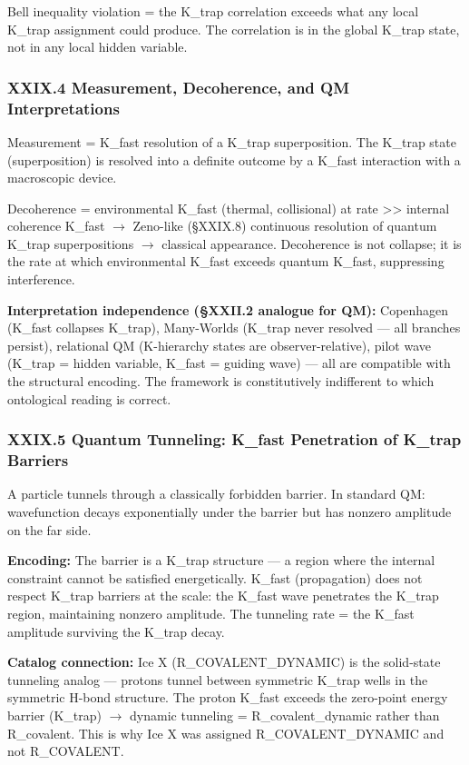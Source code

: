 \documentclass[12pt,a4paper]{article}
\begin{document}
Bell inequality violation = the K\_trap correlation exceeds what any local K\_trap assignment could produce. The correlation is in the global K\_trap state, not in any local hidden variable.

\subsubsection{XXIX.4 Measurement, Decoherence, and QM Interpretations}

Measurement = K\_fast resolution of a K\_trap superposition. The K\_trap state (superposition) is resolved into a definite outcome by a K\_fast interaction with a macroscopic device.

Decoherence = environmental K\_fast (thermal, collisional) at rate \textgreater{}\textgreater{} internal coherence K\_fast $\rightarrow$ Zeno-like (§XXIX.8) continuous resolution of quantum K\_trap superpositions $\rightarrow$ classical appearance. Decoherence is not collapse; it is the rate at which environmental K\_fast exceeds quantum K\_fast, suppressing interference.

\textbf{Interpretation independence (§XXII.2 analogue for QM):} Copenhagen (K\_fast collapses K\_trap), Many-Worlds (K\_trap never resolved --- all branches persist), relational QM (K-hierarchy states are observer-relative), pilot wave (K\_trap = hidden variable, K\_fast = guiding wave) --- all are compatible with the structural encoding. The framework is constitutively indifferent to which ontological reading is correct.

\subsubsection{XXIX.5 Quantum Tunneling: K\_fast Penetration of K\_trap Barriers}

A particle tunnels through a classically forbidden barrier. In standard QM: wavefunction decays exponentially under the barrier but has nonzero amplitude on the far side.

\textbf{Encoding:} The barrier is a K\_trap structure --- a region where the internal constraint cannot be satisfied energetically. K\_fast (propagation) does not respect K\_trap barriers at the \hbar scale: the K\_fast wave penetrates the K\_trap region, maintaining nonzero amplitude. The tunneling rate = the K\_fast amplitude surviving the K\_trap decay.

\textbf{Catalog connection:} Ice X (R\_COVALENT\_DYNAMIC) is the solid-state tunneling analog --- protons tunnel between symmetric K\_trap wells in the symmetric H-bond structure. The proton K\_fast exceeds the zero-point energy barrier (K\_trap) $\rightarrow$ dynamic tunneling = R\_covalent\_dynamic rather than R\_covalent. This is why Ice X was assigned R\_COVALENT\_DYNAMIC and not R\_COVALENT.
\end{document}
